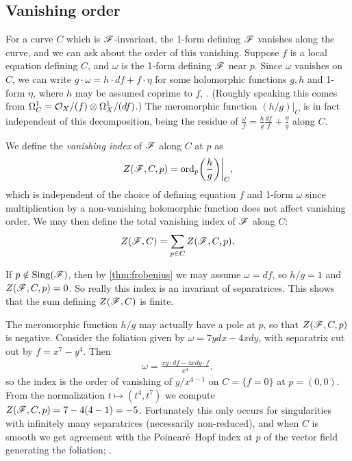 
\subsection{Vanishing order}

For a curve $C$ which is $\mathscr{F}$-invariant, the 1-form defining $\mathscr{F}$ vanishes
along the curve, and we can ask about the order of this vanishing. Suppose $f$
is a local equation defining $C$, and $\omega$ is the 1-form defining $\mathscr{F}$
near $p$. Since $\omega$ vanishes on $C$, we can write
$g\cdot\omega=h\cdot df+f\cdot\eta$ for some holomorphic functions $g,h$ and
1-form $\eta$, where $h$ may be assumed coprime to $f$, \cite{neto_86}. (Roughly
speaking this comes from $\Omega^1_C=\mathcal{O}_X/(f)\otimes\Omega^1_X/(df)$.) The
meromorphic function $(h/g)|_C$ is in fact independent of this decomposition,
being the residue of $\frac{\omega}{f}=\frac{h}{g}\frac{df}{f}+\frac{\eta}{g}$
along $C$.

\begin{definition}
    We define the \emph{vanishing index} of $\mathscr{F}$ along $C$ at $p$ as
    \begin{equation*}
        Z(\mathscr{F},C,p) = \operatorname{ord}_p\biggl(\frac{h}{g}\biggr)\bigg|_C,
    \end{equation*}
    which is independent of the choice of defining equation $f$ and 1-form
    $\omega$ since multiplication by a non-vanishing holomorphic function does
    not affect vanishing order. We may then define the total vanishing index of
    $\mathscr{F}$ along $C$:
    \begin{equation*}
        Z(\mathscr{F},C) = \sum_{p\in C}Z(\mathscr{F},C,p).
    \end{equation*}
\end{definition}

\begin{remark}
    If $p\notin\operatorname{Sing}(\mathscr{F})$, then by \cref{thm:frobenius} we may assume
    $\omega=df$, so $h/g=1$ and $Z(\mathscr{F},C,p)=0$. So really this index is an
    invariant of separatrices. This shows that the sum defining $Z(\mathscr{F},C)$ is
    finite.
\end{remark}

\begin{remark}
    The meromorphic function $h/g$ may actually have a pole at $p$, so that
    $Z(\mathscr{F},C,p)$ is negative. Consider the foliation given by
    $\omega=7ydx-4xdy$, with separatrix cut out by $f=x^{7}-y^{4}$. Then
    \begin{align*}
        \omega = \frac{xy\cdot df - 4xdy\cdot f}{x^4},
    \end{align*}
    so the index is the order of vanishing of $y/x^{4-1}$ on $C=\{f=0\}$ at
    $p=(0,0)$. From the normalization $t\mapsto(t^{4},t^{7})$ we compute
    $Z(\mathscr{F},C,p)=7-4(4-1)=-5$. Fortunately this only occurs for singularities
    with infinitely many separatrices (necessarily non-reduced), and when $C$ is
    smooth we get agreement with the Poincar\'e--Hopf index at $p$ of the vector
    field generating the foliation; \cite{brunella_97}.
\end{remark}

